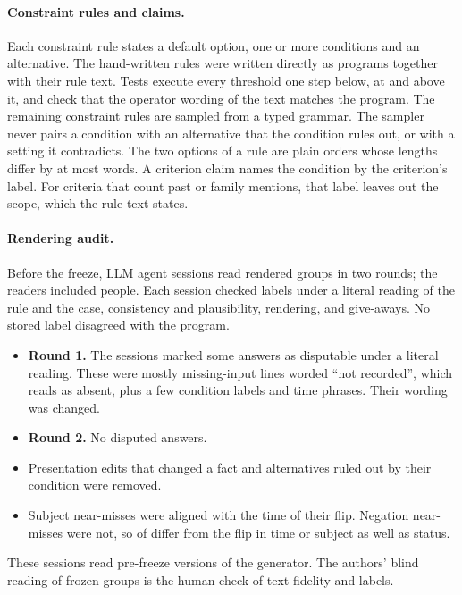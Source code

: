 \paragraph{Constraint rules and claims.}
Each constraint rule states a default option, one or more conditions and an alternative. The hand-written
rules were written directly as programs together with their rule text. Tests execute every threshold one
step below, at and above it, and check that the operator wording of the text matches the program. The
remaining constraint rules are sampled from a typed grammar. The sampler never pairs a condition with an
alternative that the condition rules out, or with a setting it contradicts. The two options of a rule are
plain orders whose lengths differ by at most
 words. A criterion claim names the
condition by the criterion's label. For 
criteria that count past or family mentions, that label leaves out the scope, which the rule text states.

\paragraph{Rendering audit.}
Before the freeze,  LLM agent sessions read
 rendered groups in two rounds; the readers included
 people. Each session
checked labels under a literal reading of the rule and the case, consistency and plausibility, rendering,
and give-aways. No stored label disagreed with the program.
\begin{itemize}
\item \textbf{Round 1.} The sessions marked some answers as disputable under a literal reading. These were
mostly missing-input lines worded ``not recorded'', which reads as absent, plus a few condition labels and
time phrases. Their wording was changed.
\item \textbf{Round 2.} No disputed answers.
\item Presentation edits that changed a fact and alternatives ruled out by their condition were removed.
\item Subject near-misses were aligned with the time of their flip. Negation near-misses were not, so
 of
 differ from the flip in time or
subject as well as status.
\end{itemize}
These sessions read pre-freeze versions of the generator. The authors' blind reading of
 frozen groups is the human check of text fidelity and labels.

